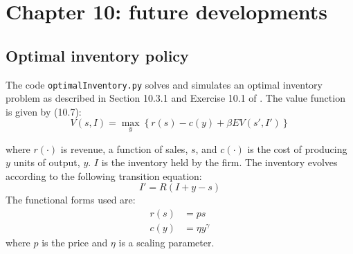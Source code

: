 \section{Chapter 10: future developments}

\subsection{Optimal inventory policy}

The code \texttt{optimalInventory.py} solves and simulates an optimal inventory problem as described in Section 10.3.1 and Exercise 10.1 of \citet{adda2003dynamic}. The value function is given by (10.7):
%
\begin{equation}
	V(s, I) = \max_{y} \left\{ r(s) - c(y) + \beta EV(s', I') \right\}
\end{equation}
%

where \(r(\cdot)\) is revenue, a function of sales, \(s\), and \(c(\cdot)\) is the cost of producing \(y\) units of output, \(y\). \(I\) is the inventory held by the firm. The inventory evolves according to the following transition equation:
%
\begin{equation}
	I' = R(I + y - s)
\end{equation}
%
The functional forms used are:
%
\begin{align}
 r(s) &=  ps \\
 c(y) &= \eta y^{\gamma}
\end{align}
%
where \(p\) is the price and \(\eta\) is a scaling parameter.

